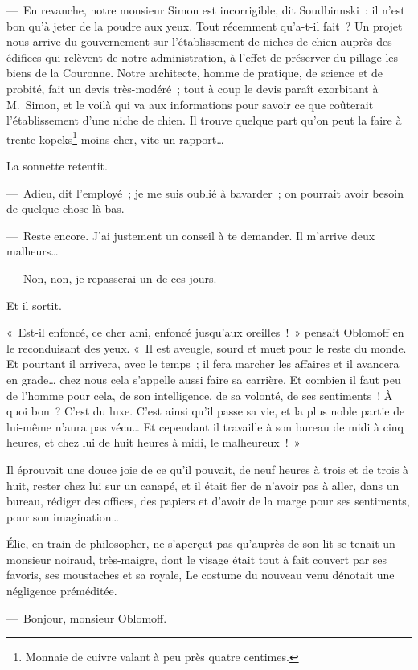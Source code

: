 \documentclass[french,twoside]{book} %
\begin{document}
— En revanche, notre monsieur Simon est incorrigible, dit Soudbinnski : il n’est bon qu’à jeter de la poudre aux yeux. Tout récemment qu’a-t-il fait ? Un projet nous arrive du gouvernement sur l’établissement de niches de chien auprès des édifices qui relèvent de notre administration, à l’effet de préserver du pillage les biens de la Couronne. Notre architecte, homme de pratique, de science et de probité, fait un devis très-modéré ; tout à coup le devis paraît exorbitant à M. Simon, et le voilà qui va aux informations pour savoir ce que coûterait l’établissement d’une niche de chien. Il trouve quelque part qu’on peut la faire à trente kopeks\footnote{Monnaie de cuivre valant à peu près quatre centimes.} moins cher, vite un rapport…\par
La sonnette retentit.\par
— Adieu, dit l’employé ; je me suis oublié à bavarder ; on pourrait avoir besoin de quelque chose là-bas.\par
— Reste encore. J’ai justement un conseil à te demander. Il m’arrive deux malheurs…\par
— Non, non, je repasserai un de ces jours.\par
Et il sortit.\par
« Est-il enfoncé, ce cher ami, enfoncé jusqu’aux oreilles ! » pensait Oblomoff en le reconduisant des yeux. « Il est aveugle, sourd et muet pour le reste du monde. Et pourtant il arrivera, avec le temps ; il fera marcher les affaires et il avancera en grade… chez nous cela s’appelle aussi faire sa carrière. Et combien il faut peu de l’homme pour cela, de son intelligence, de sa volonté, de ses sentiments ! À quoi bon ? C’est du luxe. C’est ainsi qu’il passe sa vie, et la plus noble partie de lui-même n’aura pas vécu… Et cependant il travaille à son bureau de midi à cinq heures, et chez lui de huit heures à midi, le malheureux ! »\par
Il éprouvait une douce joie de ce qu’il pouvait, de neuf heures à trois et de trois à huit, rester chez lui sur un canapé, et il était fier de n’avoir pas à aller, dans un bureau, rédiger des offices, des papiers et d’avoir de la marge pour ses sentiments, pour son imagination…\par
Élie, en train de philosopher, ne s’aperçut pas qu’auprès de son lit se tenait un monsieur noiraud, très-maigre, dont le visage était tout à fait couvert par ses favoris, ses moustaches et sa royale, Le costume du nouveau venu dénotait une négligence préméditée.\par
— Bonjour, monsieur Oblomoff.\par
\end{document}
